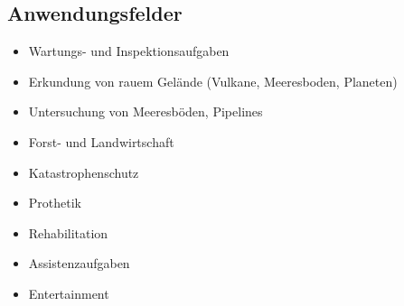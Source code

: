 \subsection{Anwendungsfelder}
\begin{itemize}
	\item Wartungs- und Inspektionsaufgaben
	\item Erkundung von rauem Gelände (Vulkane, Meeresboden, Planeten)
	\item Untersuchung von Meeresböden, Pipelines
	\item Forst- und Landwirtschaft
	\item Katastrophenschutz
	\item Prothetik
	\item Rehabilitation
	\item Assistenzaufgaben
	\item Entertainment
\end{itemize}